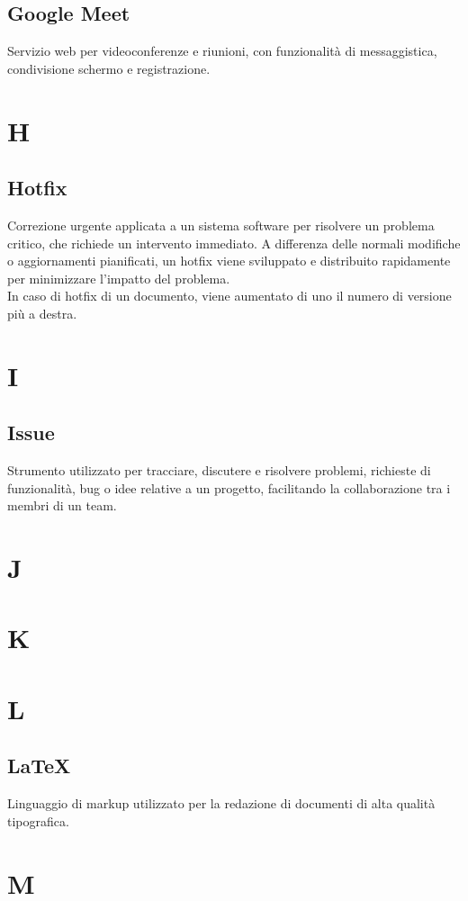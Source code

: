     \subsection{Google Meet}    
    Servizio web per videoconferenze e riunioni, con funzionalità di messaggistica,
    condivisione schermo e registrazione.
\pagebreak
\section{H}
    \subsection{Hotfix}
    Correzione urgente applicata a un sistema software per risolvere un problema critico, 
    che richiede un intervento immediato. A differenza delle normali modifiche o aggiornamenti pianificati, 
    un hotfix viene sviluppato e distribuito rapidamente per minimizzare l'impatto del problema.\\
    In caso di hotfix di un documento, viene aumentato di uno il numero di versione più a destra.
\pagebreak
\section{I}
    \subsection{Issue}
    \label{Issue}
    Strumento utilizzato per tracciare, discutere e risolvere problemi, richieste di funzionalità, 
    bug o idee relative a un progetto, facilitando la collaborazione tra i membri di un team.
\pagebreak
\section{J}
\pagebreak
\section{K}
\pagebreak
\section{L}
    \subsection{LaTeX}
    \label{LaTeX}
    Linguaggio di markup utilizzato per la redazione di documenti di alta qualità tipografica.
\pagebreak
\section{M}
